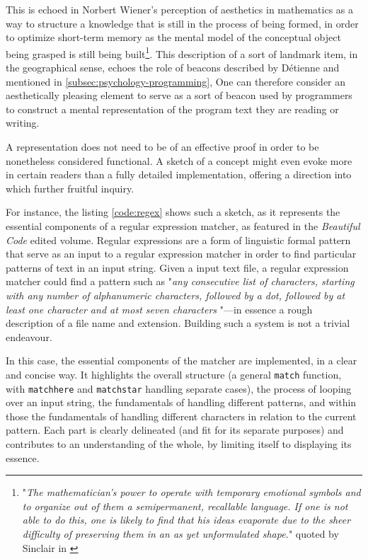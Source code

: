 This is echoed in Norbert Wiener's perception of aesthetics in mathematics as a way to structure a knowledge that is still in the process of being formed, in order to optimize short-term memory as the mental model of the conceptual object being grasped is still being built\footnote{"\emph{The mathematician's power to operate with temporary emotional symbols and to organize out of them a semipermanent, recallable language. If one is not able to do this, one is likely to find that his ideas evaporate due to the sheer difficulty of preserving them in an as yet unformulated shape.}" quoted by Sinclair in \citep{sinclair_roles_2004}}. This description of a sort of landmark item, in the geographical sense, echoes the role of beacons described by Détienne \citep{detienne_software_2001} and mentioned in \autoref{subsec:psychology-programming}, One can therefore consider an aesthetically pleasing element to serve as a sort of beacon used by programmers to construct a mental representation of the program text they are reading or writing.

A representation does not need to be of an effective proof in order to be nonetheless considered functional. A sketch of a concept might even evoke more in certain readers than a fully detailed implementation, offering a direction into which further fruitful inquiry.

For instance, the listing \autoref{code:regex} shows such a sketch, as it represents the essential components of a regular expression matcher, as featured in the \emph{Beautiful Code} edited volume. Regular expressions are a form of linguistic formal pattern that serve as an input to a regular expression matcher in order to find particular patterns of text in an input string. Given a input text file, a regular expression matcher could find a pattern such as "\emph{any consecutive list of characters, starting with any number of alphanumeric characters, followed by a dot, followed by at least one character and at most seven characters }"—in essence a rough description of a file name and extension. Building such a system is not a trivial endeavour.

In this case, the essential components of the matcher are implemented, in a clear and concise way. It highlights the overall structure (a general \lstinline{match} function, with \lstinline{matchhere} and \lstinline{matchstar} handling separate cases), the process of looping over an input string, the fundamentals of handling different patterns, and within those the fundamentals of handling different characters in relation to the current pattern. Each part is clearly delineated (and fit for its separate purposes) and contributes to an understanding of the whole, by limiting itself to displaying its essence.

